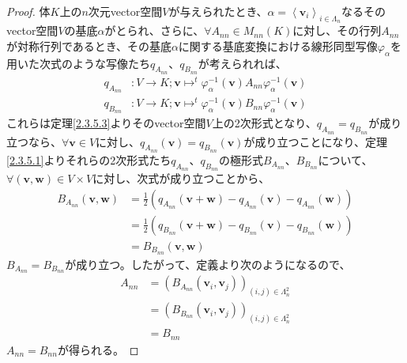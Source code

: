 \documentclass[dvipdfmx]{jsarticle}
\begin{document}
\begin{proof}
体$K$上の$n$次元vector空間$V$が与えられたとき、$\alpha = \left\langle \mathbf{v}_{i} \right\rangle_{i \in \varLambda_{n}}$なるそのvector空間$V$の基底$\alpha$がとられ、さらに、$\forall A_{nn} \in M_{nn}(K)$に対し、その行列$A_{nn}$が対称行列であるとき、その基底$\alpha$に関する基底変換における線形同型写像$\varphi_{\alpha}$を用いた次式のような写像たち$q_{A_{nn}}$、$q_{B_{nn}}$が考えられれば、
\begin{align*}
q_{A_{nn}}&:V \rightarrow K;\mathbf{v} \mapsto^{t}\varphi_{\alpha}^{- 1}\left( \mathbf{v} \right)A_{nn}\varphi_{\alpha}^{- 1}\left( \mathbf{v} \right)\\
q_{B_{nn}}&:V \rightarrow K;\mathbf{v} \mapsto^{t}\varphi_{\alpha}^{- 1}\left( \mathbf{v} \right)B_{nn}\varphi_{\alpha}^{- 1}\left( \mathbf{v} \right)
\end{align*}
これらは定理\ref{2.3.5.3}よりそのvector空間$V$上の2次形式となり、$q_{A_{nn}} = q_{B_{nn}}$が成り立つなら、$\forall\mathbf{v} \in V$に対し、$q_{A_{nn}}\left( \mathbf{v} \right) = q_{B_{nn}}\left( \mathbf{v} \right)$が成り立つことになり、定理\ref{2.3.5.1}よりそれらの2次形式たち$q_{A_{nn}}$、$q_{B_{nn}}$の極形式$B_{A_{nn}}$、$B_{B_{nn}}$について、$\forall\left( \mathbf{v},\mathbf{w} \right) \in V \times V$に対し、次式が成り立つことから、
\begin{align*}
B_{A_{nn}}\left( \mathbf{v},\mathbf{w} \right) &= \frac{1}{2}\left( q_{A_{nn}}\left( \mathbf{v} + \mathbf{w} \right) - q_{A_{nn}}\left( \mathbf{v} \right) - q_{A_{nn}}\left( \mathbf{w} \right) \right)\\
&= \frac{1}{2}\left( q_{B_{nn}}\left( \mathbf{v} + \mathbf{w} \right) - q_{B_{nn}}\left( \mathbf{v} \right) - q_{B_{nn}}\left( \mathbf{w} \right) \right)\\
&= B_{B_{nn}}\left( \mathbf{v},\mathbf{w} \right)
\end{align*}
$B_{A_{nn}} = B_{B_{nn}}$が成り立つ。したがって、定義より次のようになるので、
\begin{align*}
A_{nn} &= \left( B_{A_{nn}}\left( \mathbf{v}_{i},\mathbf{v}_{j} \right) \right)_{(i,j) \in \varLambda_{n}^{2}}\\
&= \left( B_{B_{nn}}\left( \mathbf{v}_{i},\mathbf{v}_{j} \right) \right)_{(i,j) \in \varLambda_{n}^{2}}\\
&= B_{nn}
\end{align*}
$A_{nn} = B_{nn}$が得られる。
\end{proof}
\end{document}

